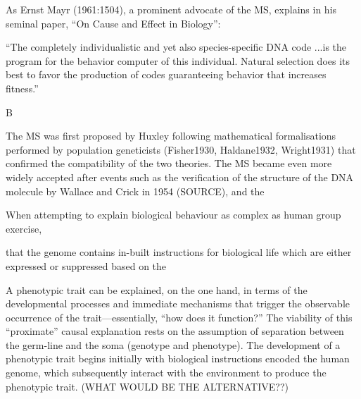 As Ernst Mayr (1961:1504), a prominent advocate of the MS, explains in his seminal paper, ``On Cause and Effect in Biology'':

``The completely individualistic and yet also species-specific DNA code ...is the program for the behavior computer of this individual. Natural selection does its best to favor the production of codes guaranteeing behavior that increases fitness.''

B


The MS was first proposed by Huxley \citep{Huxley1942} following mathematical formalisations performed by population geneticists (Fisher1930, Haldane1932, Wright1931) that confirmed the compatibility of the two theories.  The MS became even more widely accepted after events such as the verification of the structure of the DNA molecule by Wallace and Crick in 1954 (SOURCE), and the








When attempting to explain biological behaviour as complex as human group exercise,

 that the genome contains in-built instructions for biological life which are either expressed or suppressed based on the

A phenotypic trait can be explained, on the one hand, in terms of the developmental processes and immediate mechanisms that trigger the observable occurrence of the trait---essentially, ``how does it function?'' \citep{Mayr1961,Tinbergen1963}  The viability of this ``proximate'' causal explanation rests on the assumption of separation between the germ-line and the soma (genotype and phenotype). The development of a phenotypic trait begins initially with biological instructions encoded the human genome, which subsequently interact with the environment to produce the phenotypic trait.   (WHAT WOULD BE THE ALTERNATIVE??)

